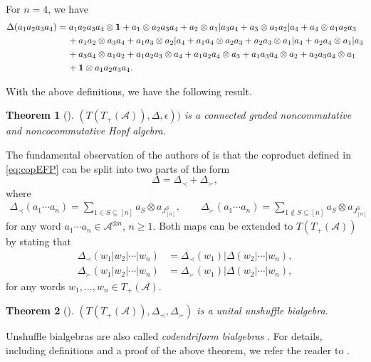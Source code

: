\documentclass[11pt]{article}
\numberwithin{equation}{section}
\numberwithin{equation}{section}
\newtheorem{Theorem}{Theorem}[section]
\newcommand{\A}{\mathcal{A}}
\newcommand{\uno}{{\bf{1}}}
\begin{document}
\begin{Example}
For $n=4$, we have
\begin{align*}
	\Delta(a_1a_2a_3a_4)
={} & a_1a_2a_3a_4\otimes \uno + a_1 \otimes a_2a_3a_4 + a_2\otimes a_1| a_3a_4 + a_3 \otimes a_1a_2| a_4 + a_4\otimes a_1a_2a_3
	\\&\!{} + a_1a_2\otimes a_3a_4 + a_1a_3\otimes a_2|a_4 + a_1a_4\otimes a_2a_3 + a_2a_3\otimes a_1|a_4 + a_2a_4\otimes a_1|a_3
	\\&\!{} + a_3a_4\otimes a_1a_2 + a_1a_2a_3\otimes a_4 + a_1a_2a_4\otimes a_3 + a_1a_3a_4\otimes a_2 + a_2a_3a_4\otimes a_1
	\\&\!{} + \uno \otimes a_1a_2a_3a_4.
\end{align*}
\end{Example}
With the above definitions, we have the following result.

\begin{Theorem}[\cite{EFP1}]\label{thm:HopfAlg}
$(T(T_+(\A)),\Delta,\epsilon))$ is a connected graded noncommutative and noncocommutative Hopf algebra.
\end{Theorem}

The fundamental observation of the authors of \cite{EFP1} is that the coproduct defined in \eqref{eq:copEFP} can be split into two parts of the form
\[
	\Delta = \Delta_\prec + \Delta_\succ,
\]
where
\begin{gather*}
	\Delta_\prec (a_1\cdots a_n)
	= \sum_{1\in S\subseteq [n]} a_S \otimes a_{J_{[n]}^S},\qquad
 	\Delta_\succ (a_1\cdots a_n)
	= \sum_{1\not\in S\subseteq [n]} a_S \otimes a_{J_{[n]}^S}
\end{gather*}
for any word $a_1\cdots a_n\in \A^{\otimes n}$, $n\geq 1$. Both maps can be extended to $T(T_+(\A))$ by stating that
\begin{align*}
	\Delta_\prec(w_1|w_2|\cdots |w_n)
	&= \Delta_\prec(w_1)|\Delta(w_2|\cdots|w_n),\\
	\Delta_\succ(w_1|w_2|\cdots |w_n)
	&= \Delta_\succ(w_1)|\Delta(w_2|\cdots|w_n),
\end{align*}
for any words $w_1,\dots,w_n\in T_+(\A)$.

\begin{Theorem}[\cite{EFP1}]
\label{thm:unshuffle}
$(T(T_+(\A)),\Delta_\prec,\Delta_\succ)$ is a unital unshuffle bialgebra.
\end{Theorem}

Unshuffle bialgebras are also called \textit{codendriform bialgebras} \cite{Foissy}. For details, including definitions and a proof of the above theorem, we refer the reader to \cite[Theorem~5]{EFP1}.
\end{document}
